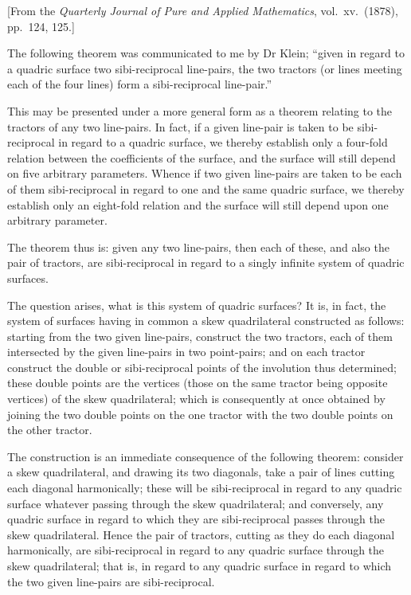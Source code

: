 \documentclass[11pt,a4paper]{book}
\begin{document}
[From the \textit{Quarterly Journal of Pure and Applied Mathematics}, vol.\ xv.\ (1878), pp.\ 124, 125.]

The following theorem was communicated to me by Dr Klein; ``given in regard to a quadric surface two sibi-reciprocal line-pairs, the two tractors (or lines meeting each of the four lines) form a sibi-reciprocal line-pair.''

This may be presented under a more general form as a theorem relating to the tractors of any two line-pairs. In fact, if a given line-pair is taken to be sibi-reciprocal in regard to a quadric surface, we thereby establish only a four-fold relation between the coefficients of the surface, and the surface will still depend on five arbitrary parameters. Whence if two given line-pairs are taken to be each of them sibi-reciprocal in regard to one and the same quadric surface, we thereby establish only an eight-fold relation and the surface will still depend upon one arbitrary parameter.

The theorem thus is: given any two line-pairs, then each of these, and also the pair of tractors, are sibi-reciprocal in regard to a singly infinite system of quadric surfaces.

The question arises, what is this system of quadric surfaces? It is, in fact, the system of surfaces having in common a skew quadrilateral constructed as follows: starting from the two given line-pairs, construct the two tractors, each of them intersected by the given line-pairs in two point-pairs; and on each tractor construct the double or sibi-reciprocal points of the involution thus determined; these double points are the vertices (those on the same tractor being opposite vertices) of the skew quadrilateral; which is consequently at once obtained by joining the two double points on the one tractor with the two double points on the other tractor.

The construction is an immediate consequence of the following theorem: consider a skew quadrilateral, and drawing its two diagonals, take a pair of lines cutting each diagonal harmonically; these will be sibi-reciprocal in regard to any quadric surface whatever passing through the skew quadrilateral; and conversely, any quadric surface in regard to which they are sibi-reciprocal passes through the skew quadrilateral. Hence the pair of tractors, cutting as they do each diagonal harmonically, are sibi-reciprocal in regard to any quadric surface through the skew quadrilateral; that is, in regard to any quadric surface in regard to which the two given line-pairs are sibi-reciprocal.
\end{document}
